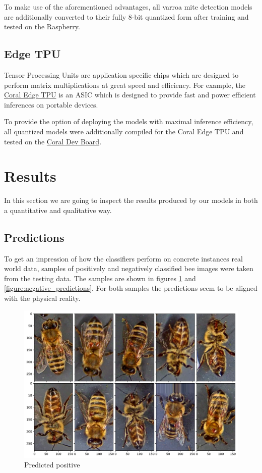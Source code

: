 \documentclass[12pt,a4paper]{article}
\begin{document}
To make use of the aforementioned advantages, all varroa mite detection models are additionally converted to their fully 8-bit quantized form after training and tested on the Raspberry.

\subsection{Edge TPU}

Tensor Processing Units are application specific chips which are designed to perform matrix multiplications at great speed and efficiency. For example, the \href{https://coral.ai/docs/edgetpu/faq/}{Coral Edge TPU} is an ASIC which is designed to provide fast and power efficient inferences on portable devices.

To provide the option of deploying the models with maximal inference efficiency, all quantized models were additionally compiled for the Coral Edge TPU and tested on the \href{https://coral.ai/products/dev-board/}{Coral Dev Board}.

\section{Results}

In this section we are going to inspect the results produced by our models in both a quantitative and qualitative way.

\subsection{Predictions}
To get an impression of how the classifiers perform on concrete instances real world data, samples of positively and negatively classified bee images were taken from the testing data. The samples are shown in figures \ref{figure:positive_predictions} and  \ref{figure:negative_predictions}. For both samples the predictions seem to be aligned with the physical reality.
 
\begin{figure}[H]
\centering
\includegraphics[width=13.5cm]{samples_positive.png}
\caption{Predicted positive}
\label{figure:positive_predictions}
\end{figure}
\end{document}
